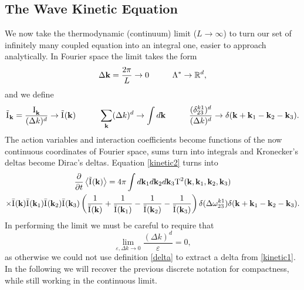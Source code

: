 \subsection{The Wave Kinetic Equation}

We now take the thermodynamic (continuum) limit ($L \rightarrow \infty$) to turn our set of infinitely many coupled equation into an integral one, easier to approach analytically.
In Fourier space the limit takes the form 
\begin{equation}
    \Delta\mathbf{ k} = \frac{2\pi}{L} \rightarrow 0 \hspace{10mm} \Lambda^* \rightarrow \mathbb{R}^d,
\end{equation}
and we define 
\begin{equation}
    \tilde{\Ia}_\mathbf{k}=\frac{\Ia_\mathbf{k}}{(\Delta k)^d} \rightarrow \tilde{\Ia}(\mathbf{k}) \hspace{10mm} \sum_\mathbf{k} (\Delta k)^d \rightarrow \int d\mathbf{k} \hspace{10mm} 
    \frac{(\delta^{k1}_{23})^d}{(\Delta k)^d} \rightarrow \delta(\mathbf{k} + \mathbf{k}_1 - \mathbf{k}_2 - \mathbf{k}_3).
\end{equation}
The action variables and interaction coefficients become functions of the now continuous coordinates of Fourier space, sums turn into integrals and Kronecker's deltas become 
Dirac's deltas. Equation \eqref{kinetic2} turns into
\begin{multline}
    \frac{\partial}{\partial t} \left\langle \tilde{\mathrm{I}^{}}(\mathbf{k})\right\rangle = 4 \pi\int d\mathbf{k}_1 d\mathbf{k}_2 d\mathbf{k}_3 
    \mathrm{T}^2(\mathbf{k}, \mathbf{k}_1, \mathbf{k}_2, \mathbf{k}_3)\\\times \bar{\mathrm{I}^{}}(\mathbf{k})\bar{\mathrm{I}^{}}(\mathbf{k}_1)\bar{\mathrm{I}^{}}(\mathbf{k}_2)\bar{\mathrm{I}^{}}(\mathbf{k}_3)
    \left(\frac{1}{\bar{\mathrm{I}^{}}(\mathbf{k})} + \frac{1}{\bar{\mathrm{I}^{}}(\mathbf{k}_1)} - \frac{1}{\bar{\mathrm{I}^{}}(\mathbf{k}_2)}- \frac{1}{\bar{\mathrm{I}^{}}(\mathbf{k}_3)}  \right)
    \delta(\Delta{\omega}^{k1}_{23})\delta(\mathbf{k} + \mathbf{k}_1 - \mathbf{k}_2 - \mathbf{k}_3).
    \label{kinetic3}
\end{multline}
In performing the limit we must be careful to require that 
\begin{equation}
\underset{\varepsilon, \Delta k \rightarrow 0}{\lim} \frac{(\Delta k)^d}{\varepsilon} = 0 ,
\end{equation}
as otherwise we could not use definition \eqref{delta} to extract a delta from \eqref{kinetic1}. \\
In the following we will recover the previous discrete notation for compactness, while still working in the continuous limit.\\

